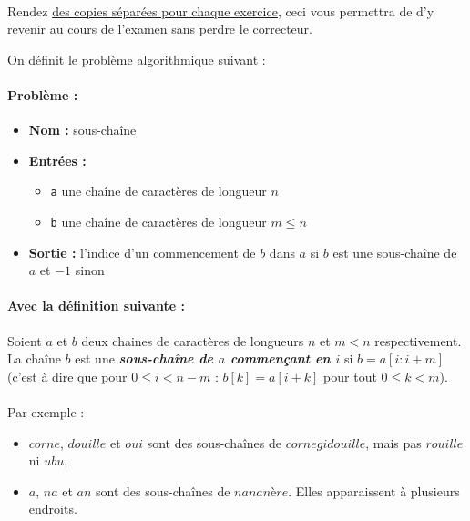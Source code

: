 \documentclass{article}
\theoremstyle{exostyle}
\theoremstyle{partiestyle}
\theoremstyle{questionstyle}
\begin{document}
\paragraph{}{\large \sc Rendez \underline{des copies séparées pour chaque exercice}, ceci vous permettra de d'y revenir au cours de l'examen sans perdre le correcteur.}

\vspace*{1cm}

On définit le problème algorithmique suivant :

\paragraph{Problème :}
\begin{itemize}
    \item {\bf Nom :} sous-chaîne
\item {\bf Entrées :}
    \begin{itemize}
        \item \texttt{a} une chaîne de caractères de longueur $n$
        \item \texttt{b} une chaîne de caractères de longueur $m \leq n$
    \end{itemize}
\item {\bf Sortie :} l'indice d'un commencement de $b$ dans $a$ si $b$ est une sous-chaîne de $a$ et $-1$ sinon
\end{itemize}

\paragraph{Avec la définition suivante :} Soient $a$ et $b$ deux chaines de caractères de longueurs $n$ et $m <n$ respectivement. La chaîne $b$ est une \textbf{\textit{sous-chaîne de $a$ commençant en $i$}} si $b = a[i:i+m]$ (c'est à dire que pour $0 \leq i < n-m$ : $b[k] = a[i+k]$ pour tout $0\leq k<m$).


\paragraph{}Par exemple :

\begin{itemize}
\item $corne$, $douille$ et $oui$ sont des sous-chaînes de $cornegidouille$, mais pas $rouille$ ni $ubu$,
\item $a$, $na$ et $an$ sont des sous-chaînes de $nananère$. Elles apparaissent à plusieurs endroits.
\end{itemize}
\end{document}
